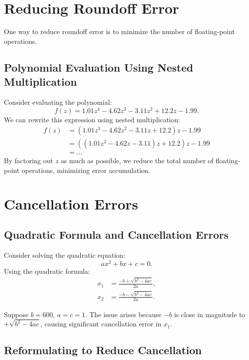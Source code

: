 \section{Reducing Roundoff Error}

One way to reduce roundoff error is to minimize the number of floating-point 
operations.

\subsection{Polynomial Evaluation Using Nested Multiplication}

Consider evaluating the polynomial:
\begin{equation*}
    f(z) = 1.01z^4 - 4.62z^3 - 3.11z^2 + 12.2z - 1.99.
\end{equation*}
We can rewrite this expression using nested multiplication:
\begin{align*}
    f(z) &= (1.01z^3 - 4.62z^2 - 3.11z + 12.2)z - 1.99 \\
         &= ((1.01z^2 - 4.62z - 3.11)z + 12.2)z - 1.99 \\
         &= \dots
\end{align*}
By factoring out $z$ as much as possible, we reduce the total number of 
floating-point operations, minimizing error accumulation.

\section{Cancellation Errors}

\subsection{Quadratic Formula and Cancellation Errors}

Consider solving the quadratic equation:
\begin{equation*}
    ax^2 + bx + c = 0.
\end{equation*}
Using the quadratic formula:
\begin{align*}
    x_1 &= \frac{-b + \sqrt{b^2 - 4ac}}{2a}, \\
    x_2 &= \frac{-b - \sqrt{b^2 - 4ac}}{2a}.
\end{align*}

Suppose $b = 600$, $a = c = 1$. The issue arises because $-b$ is close in 
magnitude to $+\sqrt{b^2 - 4ac}$, causing significant cancellation error in 
$x_1$.

\subsection{Reformulating to Reduce Cancellation}

